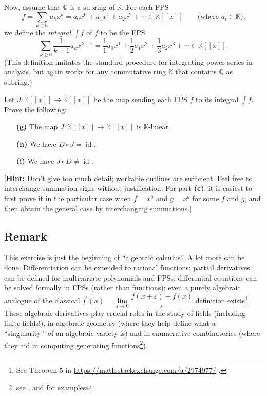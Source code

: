 \documentclass[paper=a4, fontsize=12pt]{scrartcl}%
\let\sumnonlimits\sum
\renewcommand{\sum}{\sumnonlimits\limits}
\theoremstyle{plainsl}
\theoremstyle{definition}
\theoremstyle{remark}
\begin{document}
Now, assume that $\mathbb{Q}$ is a subring of $\mathbb{K}$. For each FPS
\[
f = \sum_{k \in\mathbb{N}} a_{k} x^{k} = a_{0} x^{0} + a_{1} x^{1} + a_{2}
x^{2} + \cdots\in\mathbb{K}\left[  \left[  x \right]  \right]  \qquad
\text{(where $a_{i} \in\mathbb{K}$),}%
\]
we define the \textit{integral} $\int f$ of $f$ to be the FPS
\[
\sum_{k \geq0} \dfrac{1}{k+1} a_{k} x^{k+1} = \dfrac{1}{1} a_{0} x^{1} +
\dfrac{1}{2} a_{1} x^{2} + \dfrac{1}{3} a_{2} x^{3} + \cdots\in\mathbb{K}%
\left[  \left[  x \right]  \right]  .
\]
(This definition imitates the standard procedure for integrating power series
in analysis, but again works for any commutative ring $\mathbb{K}$ that
contains $\mathbb{Q}$ as subring.)

Let $J : \mathbb{K}\left[  \left[  x \right]  \right]  \to\mathbb{K}\left[
\left[  x \right]  \right]  $ be the map sending each FPS $f$ to its integral
$\int f$. Prove the following:

\begin{enumerate}
\item[\textbf{(g)}] The map $J : \mathbb{K}\left[  \left[  x \right]  \right]
\to\mathbb{K}\left[  \left[  x \right]  \right]  $ is $\mathbb{K}$-linear.

\item[\textbf{(h)}] We have $D \circ J = \operatorname{id}$.

\item[\textbf{(i)}] We have $J \circ D \neq\operatorname{id}$.
\end{enumerate}

[\textbf{Hint:} Don't give too much detail; workable outlines are sufficient.
Feel free to interchange summation signs without justification. For part
\textbf{(c)}, it is easiest to first prove it in the particular case when $f =
x^{a}$ and $g = x^{b}$ for some $f$ and $g$, and then obtain the general case
by interchanging summations.]

\subsection{Remark}

This exercise is just the beginning of \textquotedblleft algebraic
calculus\textquotedblright. A lot more can be done: Differentiation can be
extended to rational functions; partial derivatives can be defined for
multivariate polynomials and FPSs; differential equations can be solved
formally in FPSs (rather than functions); even a purely algebraic analogue of
the classical $f^{\prime}\left(  x\right)  =\lim\limits_{\varepsilon
\rightarrow0}\dfrac{f\left(  x+\varepsilon\right)  -f\left(  x\right)
}{\varepsilon}$ definition exists\footnote{See Theorem 5 in
\url{https://math.stackexchange.com/a/2974977/} .}. These algebraic
derivatives play crucial roles in the study of fields (including finite
fields!), in algebraic geometry (where they help define what a
\textquotedblleft singularity\textquotedblright\ of an algebraic variety is)
and in enumerative combinatorics (where they aid in computing generating
functions\footnote{see \cite[\S 7.8 and further on]{Loehr-BC}, \cite{Wilf94}
and \cite[\S 7.2 and further on]{GKP} for examples}).
\end{document}
